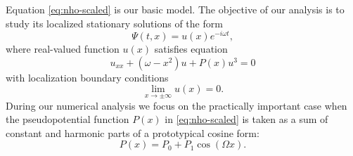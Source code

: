 Equation \eqref{eq:nho-scaled} is our basic model.
The objective of our analysis is to study its localized stationary solutions of the form
\begin{equation}
	\Psi(t, x) = u(x) e^{-i \omega t},
\end{equation}
where real-valued function $u(x)$ satisfies equation
\begin{equation}
	u_{xx} + (\omega - x^2) u + P(x) u^3 = 0
\label{eq:stationary-nho}
\end{equation}
with localization boundary conditions
\begin{equation}
	\lim \limits_{x \to \pm \infty} u(x) = 0.
\end{equation}
During our numerical analysis we focus on the practically important case when the pseudopotential function $P(x)$ in \eqref{eq:nho-scaled} is taken as a sum of constant and harmonic parts of a prototypical cosine form:
\begin{equation}
	P(x) = P_0 + P_1 \cos (\Omega x).
\label{eq:nho-pseudopotential}
\end{equation}

